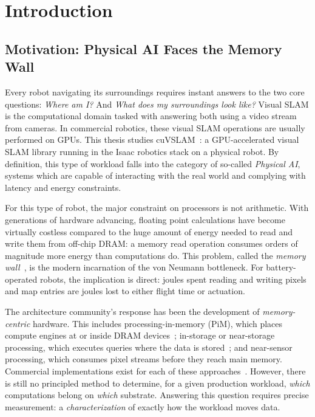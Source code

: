 \chapter{Introduction}\label{ch:intro}

\section{Motivation: Physical AI Faces the Memory Wall}

Every robot navigating its surroundings requires instant answers to the two core questions: \emph{Where am I?} And \emph{What does my surroundings look like?} Visual SLAM is the computational domain tasked with answering both using a video stream from cameras. In commercial robotics, these visual SLAM operations are usually performed on GPUs. This thesis studies cuVSLAM~\cite{cuvslam2025}: a GPU-accelerated visual SLAM library running in the Isaac robotics stack on a physical robot. By definition, this type of workload falls into the category of so-called \emph{Physical AI}, systems which are capable of interacting with the real world and complying with latency and energy constraints.

For this type of robot, the major constraint on processors is not arithmetic. With generations of hardware advancing, floating point calculations have become virtually costless compared to the huge amount of energy needed to read and write them from off-chip DRAM: a memory read operation consumes orders of magnitude more energy than computations do. This problem, called the \emph{memory wall}~\cite{wulf1995memorywall}, is the modern incarnation of the von Neumann bottleneck. For battery-operated robots, the implication is direct: joules spent reading and writing pixels and map entries are joules lost to either flight time or actuation.

The architecture community's response has been the development of \emph{memory-centric} hardware. This includes processing-in-memory (PiM), which places compute engines at or inside DRAM devices~\cite{mutlu2019pim,ghose2019pim}; in-storage or near-storage processing, which executes queries where the data is stored~\cite{do2013smartssd,gu2016biscuit}; and near-sensor processing, which consumes pixel streams before they reach main memory. Commercial implementations exist for each of these approaches~\cite{gomezluna2021upmem,kwon2021hbmpim,lee2022aim}. However, there is still no principled method to determine, for a given production workload, \emph{which} computations belong on \emph{which} substrate. Answering this question requires precise measurement: a \emph{characterization} of exactly how the workload moves data.


